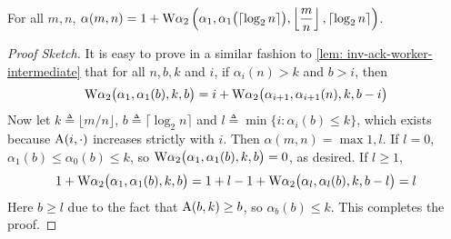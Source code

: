 \begin{thm}
	For all $m, n$, $\displaystyle \alpha(m, n) = 1 + \text{W}\alpha_2\left(\alpha_1, \alpha_1\big(\lceil\log_2n \rceil\big), \left\lfloor \frac{m}{n} \right\rfloor, \lceil\log_2n \rceil \right)$.
\end{thm}
\begin{proof}[Proof Sketch]
	 It is easy to prove in a similar fashion to \cref{lem: inv-ack-worker-intermediate} that for all $n, b, k$ and $i$, if $\alpha_i(n) > k$ and $b > i$, then
	\begin{equation*}
	\text{W}\alpha_2\big(\alpha_1, \alpha_1(b), k, b\big) = i + \text{W}\alpha_2\big(\alpha_{i+1}, \alpha_{i+1}(n), k, b - i\big)
	\end{equation*}
	Now let $k \triangleq \lfloor m/n \rfloor$, $b \triangleq \lceil \log_2n \rceil$ and $l \triangleq \min\big\{i : \alpha_i(b)\le k\big\}$, which exists because $\text{A}(i, \cdot)$ increases strictly with $i$. Then $\alpha(m, n) = \max{1, l}$. If $l = 0$, $\alpha_1(b) \le \alpha_0(b) \le k$, so $\text{W}\alpha_2\big(\alpha_1, \alpha_1(b), k, b\big) = 0$, as desired. If $l \ge 1$,
	\begin{equation*}
	1 + \text{W}\alpha_2\big(\alpha_1, \alpha_1(b), k, b\big)
	= 1 + l - 1 + \text{W}\alpha_2\big(\alpha_l, \alpha_l(b), k, b-l\big) = l
	\end{equation*}
	Here $b\ge l$ due to the fact that $\text{A}(b, k)\ge b$, so $\alpha_b(b)\le k$. This completes the proof.
\end{proof}

